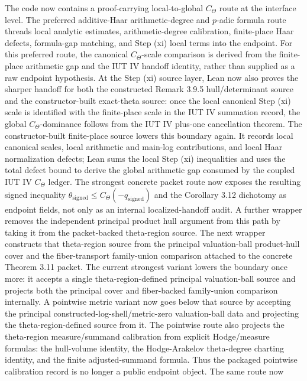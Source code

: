 \documentclass[11pt]{article}
\newcommand{\CTheta}{C_\Theta}
\theoremstyle{plain}
\theoremstyle{definition}
\theoremstyle{remark}
\begin{document}
The code now contains a proof-carrying local-to-global \(\CTheta\) route at the
interface level.  The preferred additive-Haar arithmetic-degree and \(p\)-adic
formula route threads local analytic estimates, arithmetic-degree calibration,
finite-place Haar defects, formula-gap matching, and Step (xi) local terms into
the endpoint.  For this preferred route, the canonical \(\CTheta\)-scale
comparison is derived from the finite-place arithmetic gap and the IUT IV
handoff identity, rather than supplied as a raw endpoint hypothesis.
At the Step (xi) source layer, Lean now also proves the sharper handoff for both
the constructed Remark 3.9.5 hull/determinant source and the constructor-built
exact-theta source: once the local canonical Step (xi) scale is identified with
the finite-place scale in the IUT IV summation record, the global
\(\CTheta\)-dominance follows from the IUT IV plus-one cancellation theorem.
The constructor-built finite-place source lowers this boundary again.  It
records local canonical scales, local arithmetic and main-log contributions,
and local Haar normalization defects; Lean sums the local Step (xi) inequalities
and uses the total defect bound to derive the global arithmetic gap consumed by
the coupled IUT IV \(C_\Theta\) ledger.  The strongest concrete packet route
now exposes the resulting signed inequality
\(\theta_{\mathrm{signed}}\le C_\Theta(-q_{\mathrm{signed}})\) and the
Corollary 3.12 dichotomy as endpoint fields, not only as an internal
localized-handoff audit.  A further wrapper removes the independent principal
product hull argument from this path by taking it from the packet-backed
theta-region source.  The next wrapper constructs that theta-region source
from the principal valuation-ball product-hull cover and the fiber-transport
family-union comparison attached to the concrete Theorem 3.11 packet.  The
current strongest variant lowers the boundary once more: it accepts a single
theta-region-defined principal valuation-ball source and projects both the
principal cover and fiber-backed family-union comparison internally.  A
pointwise metric variant now goes below that source by accepting the principal
constructed-log-shell/metric-zero valuation-ball data and projecting the
theta-region-defined source from it.  The pointwise route also projects the
theta-region measure/summand calibration from explicit Hodge/measure formulas:
the hull-volume identity, the Hodge-Arakelov theta-degree charting identity,
and the finite adjusted-summand formula.  Thus the packaged pointwise
calibration record is no longer a public endpoint object.  The same route now
\end{document}

